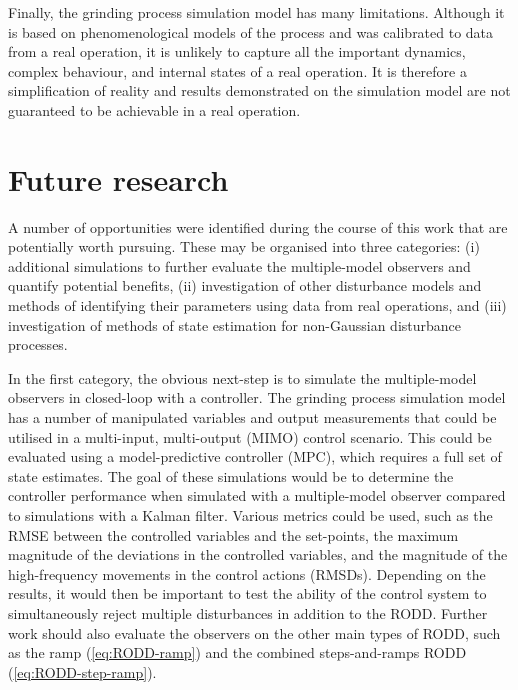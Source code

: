 Finally, the grinding process simulation model has many limitations. Although it is based on phenomenological models of the process and was calibrated to data from a real operation, it is unlikely to capture all the important dynamics, complex behaviour, and internal states of a real operation. It is therefore a simplification of reality and results demonstrated on the simulation model are not guaranteed to be achievable in a real operation.

\section{Future research} \label{sec:future-research}

A number of opportunities were identified during the course of this work that are potentially worth pursuing. These may be organised into three categories: (i) additional simulations to further evaluate the multiple-model observers and quantify potential benefits, (ii) investigation of other disturbance models and methods of identifying their parameters using data from real operations, and (iii) investigation of methods of state estimation for non-Gaussian disturbance processes.

In the first category, the obvious next-step is to simulate the multiple-model observers in closed-loop with a controller. The grinding process simulation model has a number of manipulated variables and output measurements that could be utilised in a multi-input, multi-output (\gls{MIMO}) control scenario. This could be evaluated using a model-predictive controller (\gls{MPC}), which requires a full set of state estimates. 
The goal of these simulations would be to determine the controller performance when simulated with a multiple-model observer compared to simulations with a Kalman filter. Various metrics could be used, such as the \gls{RMSE} between the controlled variables and the set-points, the maximum magnitude of the deviations in the controlled variables, and the magnitude of the high-frequency movements in the control actions (\gls{RMSD}s). Depending on the results, it would then be important to test the ability of the control system to simultaneously reject multiple disturbances in addition to the \gls{RODD}. Further work should also evaluate the observers on the other main types of \gls{RODD}, such as the ramp (\ref{eq:RODD-ramp}) and the combined steps-and-ramps \gls{RODD} (\ref{eq:RODD-step-ramp}).

